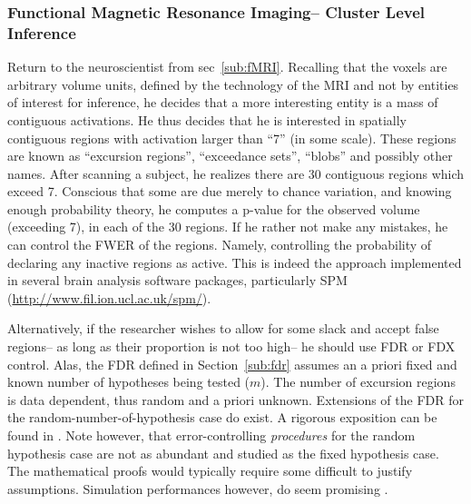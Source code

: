 \documentclass[review,12pt]{article}
\theoremstyle{definition}
\theoremstyle{definition}
\begin{document}
\subsubsection{Functional Magnetic Resonance Imaging-- Cluster Level Inference}

Return to the neuroscientist from sec~\ref{sub:fMRI}. Recalling that the voxels are arbitrary volume units, defined by the technology of the MRI and not by entities of interest for inference, he decides that a more interesting entity is a mass of contiguous activations. He thus decides that he is interested in spatially contiguous regions with activation larger than ``7'' (in some scale). These regions are known as ``excursion regions'', ``exceedance sets'', ``blobs'' and possibly other names. 
After scanning a subject, he realizes there are 30 contiguous regions which exceed 7. Conscious that some are  due merely to chance variation, and knowing enough probability theory, he computes a p-value for the observed volume (exceeding 7), in each of the 30 regions. If he rather not make any mistakes, he can control the FWER of the regions. Namely, controlling the probability of declaring any inactive regions as active. This is indeed the approach implemented in several brain analysis software packages, particularly SPM (\url{http://www.fil.ion.ucl.ac.uk/spm/}).

Alternatively, if the researcher wishes to allow for some slack and accept false regions-- as long as their proportion is not too high-- he should use FDR or FDX control. Alas, the FDR defined in Section~\ref{sub:fdr} assumes an a priori fixed and known number of hypotheses being tested ($m$). The number of excursion regions is data dependent, thus random and a priori unknown. Extensions of the FDR for the random-number-of-hypothesis case do exist. A rigorous exposition can be found in  \citet{siegmund_false_2011}. Note however, that error-controlling \emph{procedures} for the random hypothesis case are not as abundant and studied as the fixed hypothesis case. The mathematical proofs would typically require some difficult to justify assumptions. Simulation performances however, do seem promising \citep{chumbley_false_2009,chumbley_topological_2010}.
\end{document}
